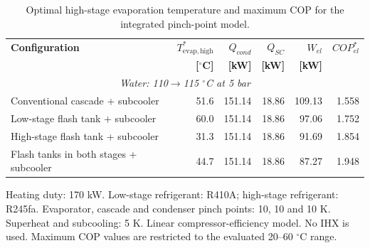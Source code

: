 \begin{table}[htbp]
\centering
\caption{Optimal high-stage evaporation temperature and maximum COP for the integrated pinch-point model.}
\label{tab:integrated_pinch_optimum}
\small
\begin{tabular}{lrrrrr}
\hline
\textbf{Configuration} & \textbf{$T_{\mathrm{evap,high}}^{*}$} & \textbf{$Q_{cond}$} & \textbf{$Q_{SC}$} & \textbf{$W_{el}$} & \textbf{$COP_{el}^{*}$} \\
 & \textbf{[$^{\circ}$C]} & \textbf{[kW]} & \textbf{[kW]} & \textbf{[kW]} & \\
\hline
\multicolumn{6}{c}{\textit{Water: 110$\rightarrow$115 $^{\circ}$C at 5 bar}} \\
\hline
Conventional cascade + subcooler & 51.6 & 151.14 & 18.86 & 109.13 & 1.558 \\
Low-stage flash tank + subcooler & 60.0 & 151.14 & 18.86 & 97.06 & 1.752 \\
High-stage flash tank + subcooler & 31.3 & 151.14 & 18.86 & 91.69 & 1.854 \\
Flash tanks in both stages + subcooler & 44.7 & 151.14 & 18.86 & 87.27 & 1.948 \\
\hline
\end{tabular}

\vspace{1.5mm}
\begin{minipage}{0.96\linewidth}
\footnotesize
Heating duty: 170 kW. Low-stage refrigerant: R410A; high-stage refrigerant: R245fa.
Evaporator, cascade and condenser pinch points: 10, 10 and 10 K. Superheat and subcooling: 5 K.
Linear compressor-efficiency model. No IHX is used. Maximum COP values are restricted to the evaluated 20--60 $^{\circ}$C range.
\end{minipage}
\end{table}
